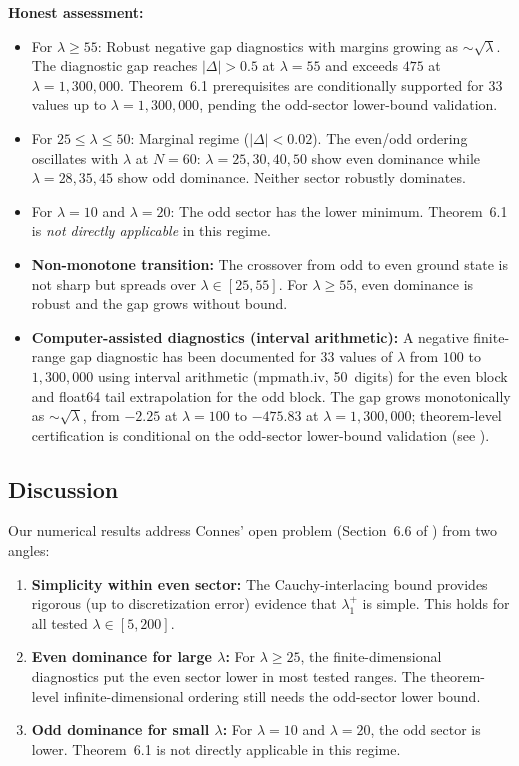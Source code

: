 \documentclass[12pt,a4paper]{article}
\theoremstyle{definition}
\theoremstyle{remark}
\begin{document}
\medskip\noindent
\textbf{Honest assessment:}
\begin{itemize}
  \item For $\lambda \geq 55$: Robust negative gap diagnostics with margins growing as $\sim\!\sqrt{\lambda}$. The diagnostic gap reaches $|\Delta| > 0.5$ at $\lambda = 55$ and exceeds $475$ at $\lambda = 1{,}300{,}000$. Theorem~6.1 prerequisites are conditionally supported for $33$ values up to $\lambda = 1{,}300{,}000$, pending the odd-sector lower-bound validation.
  \item For $25 \leq \lambda \leq 50$: Marginal regime ($|\Delta| < 0.02$). The even/odd ordering oscillates with $\lambda$ at $N = 60$: $\lambda = 25, 30, 40, 50$ show even dominance while $\lambda = 28, 35, 45$ show odd dominance. Neither sector robustly dominates.
  \item For $\lambda = 10$ and $\lambda = 20$: The odd sector has the lower minimum. Theorem~6.1 is \emph{not directly applicable} in this regime.
  \item \textbf{Non-monotone transition:} The crossover from odd to even ground state is not sharp but spreads over $\lambda \in [25, 55]$. For $\lambda \geq 55$, even dominance is robust and the gap grows without bound.
  \item \textbf{Computer-assisted diagnostics (interval arithmetic):} A negative finite-range gap diagnostic has been documented for $33$ values of $\lambda$ from $100$ to $1{,}300{,}000$ using interval arithmetic (mpmath.iv, 50~digits) for the even block and float64 tail extrapolation for the odd block. The gap grows monotonically as $\sim\!\sqrt{\lambda}$, from $-2.25$ at $\lambda = 100$ to $-475.83$ at $\lambda = 1{,}300{,}000$; theorem-level certification is conditional on the odd-sector lower-bound validation (see ).
\end{itemize}

\subsection{Discussion}

Our numerical results address Connes' open problem (Section~6.6 of \cite{Connes2026}) from two angles:
\begin{enumerate}
  \item \textbf{Simplicity within even sector:} The Cauchy-interlacing bound provides rigorous (up to discretization error) evidence that $\lambda_1^+$ is simple. This holds for all tested $\lambda \in [5, 200]$.
  \item \textbf{Even dominance for large $\lambda$:} For $\lambda \geq 25$, the finite-dimensional diagnostics put the even sector lower in most tested ranges. The theorem-level infinite-dimensional ordering still needs the odd-sector lower bound.
  \item \textbf{Odd dominance for small $\lambda$:} For $\lambda = 10$ and $\lambda = 20$, the odd sector is lower. Theorem~6.1 is not directly applicable in this regime.
\end{enumerate}
\end{document}
